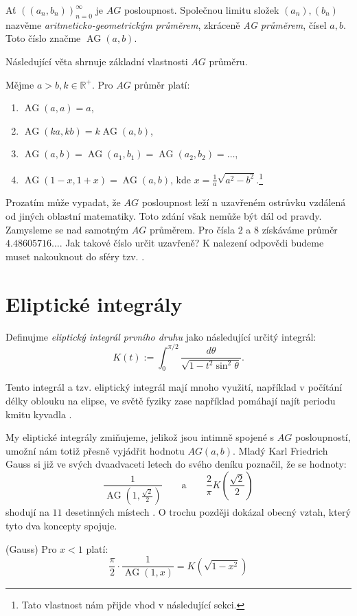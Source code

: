 \documentclass[12pt]{report}
\DeclareMathOperator{\AG}{AG}
\begin{document}
\begin{definice}
Ať $((a_n,b_n))_{n=0}^{\infty}$ je $AG$ posloupnost. Společnou limitu složek $(a_n),(b_n)$ nazvěme \textit{aritmeticko-geometrickým průměrem}, zkráceně \textit{AG průměrem}, čísel $a,b$. Toto číslo značme $\AG(a,b)$.
\end{definice}


Následující věta shrnuje základní vlastnosti $AG$ průměru.


\begin{veta}\label{zkjb}
Mějme $a>b,k \in \mathbb{R}^{+}$. Pro $AG$ průměr platí:
\begin{enumerate}
\item $\AG(a,a) = a$,
\item $\AG(ka,kb) = k \AG (a,b)$,\label{zkjb2}
\item $\AG(a,b) = \AG(a_1,b_1) = \AG(a_2,b_2) = \dots$,
\item $\AG(1-x,1+x) = \AG(a,b)$, kde $x = \frac{1}{a} \sqrt{a^2 - b^2}$.\footnote[1]{Tato vlastnost nám přijde vhod v následující sekci.}
\end{enumerate}
\end{veta}

Prozatím může vypadat, že $AG$ posloupnost leží n uzavřeném ostrůvku vzdálená od jiných oblastní matematiky. Toto zdání však nemůže být dál od pravdy. Zamysleme se nad samotným $AG$ průměrem. Pro čísla $2$ a $8$ získáváme průměr $4.48605716\dots$. Jak takové číslo určit uzavřeně? K nalezení odpovědi budeme muset nakouknout do sféry tzv. .
\section{Eliptické integrály}

\begin{definice}
Definujme \textit{eliptický integrál prvního druhu} jako následující určitý integrál:
\begin{equation*}
K(t) := \int_{0}^{\pi/2} \frac{d \theta}{\sqrt{1 - t^2 \sin^2 \theta}}.
\end{equation*}
\end{definice}

Tento integrál a tzv. eliptický integrál  mají mnoho využití, například v počítání délky oblouku na elipse, ve světě fyziky zase například pomáhají najít periodu kmitu kyvadla \cite{Crawford}.

My eliptické integrály zmiňujeme, jelikož jsou intimně spojené s $AG$ posloupností, umožní nám totiž přesně vyjádřit hodnotu $AG(a,b)$. Mladý Karl Friedrich Gauss si již ve svých dvaadvaceti letech do svého deníku poznačil, že se hodnoty:
$$\frac{1}{\AG\left(1,\frac{\sqrt{2}}{2}\right)} \qquad  \text{a} \qquad \frac{2}{\pi} K\left(\frac{\sqrt{2}}{2} \right)$$
shodují na $11$ desetinných místech \cite{Pi}. O trochu později dokázal obecný vztah, který tyto dva koncepty spojuje.
\begin{veta} (Gauss)\label{Ga}
Pro $x<1$ platí:
\begin{equation}\label{el}
\frac{\pi}{2} \cdot \frac{1}{\AG(1,x)} = K\left(\sqrt{1 - x^2}\right)
\end{equation}
\end{veta}
\end{document}
